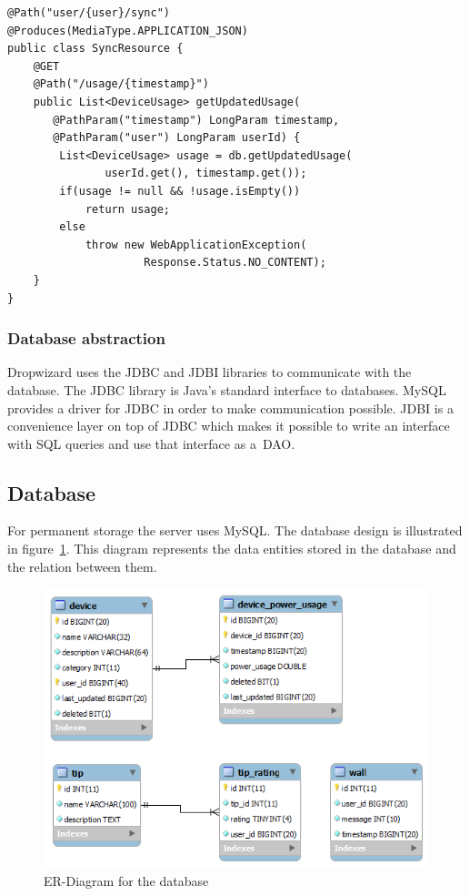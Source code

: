 \noindent\begin{minipage}{\textwidth}
\begin{lstlisting}[caption={Dropwizard resource example}, label={lst:dropwizardResource}]
@Path("user/{user}/sync")
@Produces(MediaType.APPLICATION_JSON)
public class SyncResource {
    @GET
    @Path("/usage/{timestamp}")
    public List<DeviceUsage> getUpdatedUsage(
	   @PathParam("timestamp") LongParam timestamp, 
	   @PathParam("user") LongParam userId) {
        List<DeviceUsage> usage = db.getUpdatedUsage(
		       userId.get(), timestamp.get());
        if(usage != null && !usage.isEmpty())
            return usage;
        else
            throw new WebApplicationException(
			         Response.Status.NO_CONTENT);
    }
}
\end{lstlisting}
\end{minipage}

\subsubsection{Database abstraction}
Dropwizard uses the JDBC and JDBI libraries to communicate with the database. The JDBC library is Java's standard interface to databases. MySQL provides a driver for JDBC in order to make communication possible. JDBI is a convenience layer on top of JDBC which makes it possible to write an interface with SQL queries and use that interface as a~\gls{DAO}.

\subsection{Database}
For permanent storage the server uses MySQL. The database design is illustrated in figure~\ref{fig:ER-Diagram}. This diagram represents the data entities stored in the database and the relation between them. 

\begin{figure}[H]
\includegraphics[width=\textwidth]{ch/architecture/fig/ER-Diagram.png}
\caption{ER-Diagram for the database}
\label{fig:ER-Diagram}
\end{figure}
